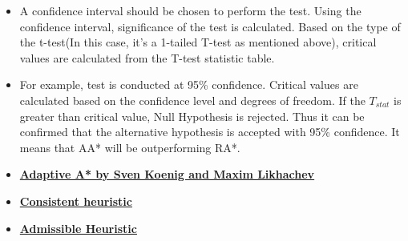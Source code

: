 \documentclass[a4 paper]{article}
\begin{document}
\begin{itemize}
    \item A confidence interval should be chosen to perform the test. Using the confidence interval, significance of the test is calculated. Based on the type of the t-test(In this case, it's a 1-tailed T-test as mentioned above), critical values are calculated from the T-test statistic table. 

    \item For example, test is conducted at 95\% confidence. Critical values are calculated based on the confidence level and degrees of freedom. If the $T_{stat}$ is greater than critical value, Null Hypothesis is rejected. Thus it can be confirmed that the alternative hypothesis is accepted with 95\% confidence. It means that AA* will be outperforming RA*. 
\end{itemize}

\newpage
\References{}
\begin{itemize}
    \item \href{https://www.cs.cmu.edu/~maxim/files/adaptastar_aamas05.pdf}{\textbf{Adaptive A* by Sven Koenig and Maxim Likhachev }}
    \item \href{https://en.wikipedia.org/wiki/Consistent_heuristic}{\textbf{Consistent heuristic }}
    \item \href{https://en.wikipedia.org/wiki/Admissible_heuristic}{\textbf{Admissible Heuristic}}
\end{itemize}
\end{document}
